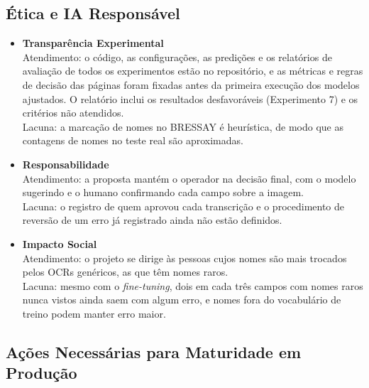\subsection{Ética e IA Responsável}

\begin{itemize}
    \item \textbf{Transparência Experimental} \\
    Atendimento: o código, as configurações, as predições e os relatórios de avaliação de todos os experimentos estão no repositório, e as métricas e regras de decisão das páginas foram fixadas antes da primeira execução dos modelos ajustados. O relatório inclui os resultados desfavoráveis (Experimento 7) e os critérios não atendidos. \\
    Lacuna: a marcação de nomes no BRESSAY é heurística, de modo que as contagens de nomes no teste real são aproximadas.

    \item \textbf{Responsabilidade} \\
    Atendimento: a proposta mantém o operador na decisão final, com o modelo sugerindo e o humano confirmando cada campo sobre a imagem. \\
    Lacuna: o registro de quem aprovou cada transcrição e o procedimento de reversão de um erro já registrado ainda não estão definidos.

    \item \textbf{Impacto Social} \\
    Atendimento: o projeto se dirige às pessoas cujos nomes são mais trocados pelos OCRs genéricos, as que têm nomes raros. \\
    Lacuna: mesmo com o \emph{fine-tuning}, dois em cada três campos com nomes raros nunca vistos ainda saem com algum erro, e nomes fora do vocabulário de treino podem manter erro maior.
\end{itemize}

\subsection{Ações Necessárias para Maturidade em Produção}


